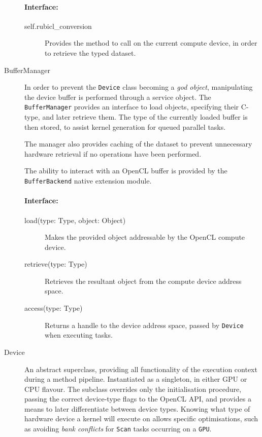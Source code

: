 \begin{description}
\paragraph*{Interface:}
\begin{description}
  \item[self.rubicl\_conversion] Provides the method to call on the current compute device, in order to retrieve the typed dataset.
\end{description}

  \item[BufferManager]
In order to prevent the \verb|Device| class becoming a \emph{god object}, manipulating the device buffer is performed through a service object. The \verb|BufferManager| provides an interface to load objects, specifying their C-type, and later retrieve them. The type of the currently loaded buffer is then stored, to assist kernel generation for queued parallel tasks.

The manager also provides caching of the dataset to prevent unnecessary hardware retrieval if no operations have been performed.

The ability to interact with an \ac{OpenCL} buffer is provided by the \verb|BufferBackend| native extension module.
\paragraph*{Interface:}
\begin{description}
  \item[load(type: Type, object: Object)] Makes the provided object addressable by the \ac{OpenCL} compute device.

  \item[retrieve(type: Type)] Retrieves the resultant object from the compute device address space.

  \item[access(type: Type)] Returns a handle to the device address space, passed by \verb|Device| when executing tasks.
\end{description}

\item[Device]
  An abstract superclass, providing all functionality of the execution context during a method pipeline. Instantiated as a singleton, in either \ac{GPU} or \ac{CPU} flavour. The subclass overrides only the initialisation procedure, passing the correct device-type flags to the \ac{OpenCL} \ac{API}, and provides a means to later differentiate between device types. Knowing what type of hardware device a kernel will execute on allows specific optimisations, such as avoiding \emph{bank conflicts} for \verb|Scan| tasks occurring on a \verb|GPU|.

\end{description}
